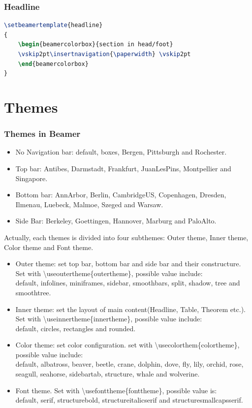 \documentclass[11pt,pdf,aspectratio=43]{beamer}
\begin{document}
\begin{frame}[fragile]
    \frametitle{Headline}

    \begin{lstlisting}[language=TeX]
\setbeamertemplate{headline}
{
    \begin{beamercolorbox}{section in head/foot}
	\vskip2pt\insertnavigation{\paperwidth} \vskip2pt
    \end{beamercolorbox}
}
    \end{lstlisting}
\end{frame}

\section{Themes}
\label{sec:themes}
\begin{frame}[allowframebreaks]
    \frametitle{Themes in Beamer}
    \begin{itemize}
	\item No Navigation bar: default, boxes, Bergen, Pittsburgh and Rochester.
	\item Top bar:	Antibes, Darmstadt, Frankfurt, JuanLesPins, Montpellier and Singapore.
	\item Bottom bar: AnnArbor, Berlin, CambridgeUS, Copenhagen, Dresden, Ilmenau, Luebeck, Malmoe, Szeged and Warsaw.
	\item Side Bar: Berkeley, Goettingen, Hannover, Marburg and PaloAlto.
    \end{itemize}

    Actually, each themes is divided into four subthemes: Outer theme, Inner theme, Color theme and Font theme.
    \begin{itemize}
	\item Outer theme: set top bar, bottom bar and side bar and their constructure. Set with \textbackslash{useoutertheme\{outertheme\}}, 
	    possible value include: \\
	    default, infolines, miniframes, sidebar, smoothbars, split, shadow, tree and smoothtree.
	\item Inner theme: set the layout of main content(Headline, Table, Theorem etc.). Set with \textbackslash{useinnertheme\{innertheme\}},
	    possible value include: \\
	    default, circles, rectangles and rounded.
	\item Color theme: set color configuration. set with \textbackslash{usecolorthem}\{colortheme\}, possible value include: \\
	    default, albatross, beaver, beetle, crane, dolphin, dove, fly, lily, orchid, rose, seagull, seahorse, sidebartab, 
	    structure, whale and wolverine.
	\item Font theme. Set with \textbackslash{usefonttheme}\{fonttheme\}, possible value is: \\
	    default, serif, structurebold, structureitalicserif and structuresmallcapsserif.
    \end{itemize}
\end{frame}
\end{document}
